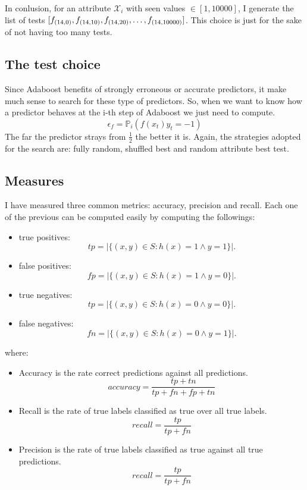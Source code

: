\documentclass{article}
\begin{document}
In conlusion, for an attribute $\mathcal{X}_i$ with seen values $\in [1,10000]$, I generate the list of tests
$[f_{(14,0)},f_{(14,10)}, \\f_{(14,20)},\dots, f_{(14,10000)}]$. This choice is just for the sake of
not having too many tests.

\subsection{The test choice}
Since Adaboost benefits of strongly erroneous or accurate predictors, it make much sense to search
for these type of predictors. So, when we want to know how a predictor behaves at the i-th step of Adaboost
we just need to compute. 
$$\epsilon_f = \mathbb{P}_i(f(x_t) y_t = -1)$$
The far the predictor strays from $\frac{1}{2}$ the better it is.
Again, the strategies adopted for the search are: fully random, shuffled best and random attribute best test.

\subsection{Measures}
I have measured three common metrics: accuracy, precision and recall.
Each one of the previous can be computed easily by computing the followings:
\begin{itemize}
	\item true positives:
	$$tp = |\{(x,y)\in S : h(x) = 1 \wedge y = 1\}|.$$
	\item false positives:
	$$fp = |\{(x,y)\in S : h(x) = 1 \wedge y = 0\}|.$$
	\item true negatives:
	$$tp = |\{(x,y)\in S : h(x) = 0 \wedge y = 0\}|.$$
	\item false negatives:
	$$fn = |\{(x,y)\in S : h(x) = 0 \wedge y = 1\}|.$$
\end{itemize}
where:
\begin{itemize}
	\item Accuracy is the rate correct predictions against all predictions.
	$$accuracy = \frac{tp+tn}{tp+fn+fp+tn}$$
	\item Recall is the rate of true labels classified as true over all true labels.
	$$recall = \frac{tp}{tp+fn}$$
	\item Precision is the rate of true labels classified as true against all true predictions.
	$$recall = \frac{tp}{tp+fn}$$

\end{itemize}
\end{document}

